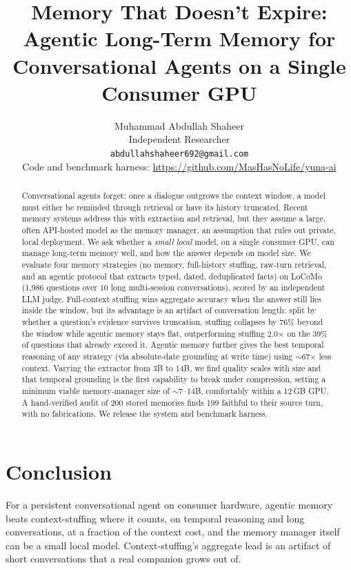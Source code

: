 \documentclass[11pt]{article}
\title{Memory That Doesn't Expire: Agentic Long-Term Memory for
Conversational Agents on a Single Consumer GPU}
\author{Muhammad Abdullah Shaheer\\
Independent Researcher\\
\texttt{abdullahshaheer692@gmail.com}\\[3pt]
\small Code and benchmark harness: \url{https://github.com/MasHasNoLife/yuna-ai}}
\date{}
\begin{document}
\maketitle

\begin{abstract}
Conversational agents forget: once a dialogue outgrows the context window, a
model must either be reminded through retrieval or have its history truncated.
Recent memory systems address this with extraction and retrieval, but they
assume a large, often API-hosted model as the memory manager, an assumption
that rules out private, local deployment. We ask whether a \emph{small local}
model, on a single consumer GPU, can manage long-term memory well, and how the
answer depends on model size. We evaluate four memory strategies (no memory,
full-history stuffing, raw-turn retrieval, and an agentic protocol that extracts
typed, dated, deduplicated facts) on LoCoMo (1{,}986 questions over 10 long
multi-session conversations), scored by an independent LLM judge. Full-context
stuffing wins aggregate accuracy when the answer still lies inside the window,
but its advantage is an artifact of conversation length: split by whether a
question's evidence survives truncation, stuffing collapses by 76\% beyond the
window while agentic memory stays flat, outperforming stuffing 2.0$\times$ on the
39\% of questions that already exceed it. Agentic memory further gives the best
temporal reasoning of any strategy (via absolute-date grounding at write time)
using $\sim$67$\times$ less context. Varying the extractor from 3B to 14B, we
find quality scales with size and that temporal grounding is the first capability
to break under compression, setting a minimum viable memory-manager size of
$\sim$7--14B, comfortably within a 12\,GB GPU. A hand-verified audit of 200
stored memories finds 199 faithful to their source turn, with no fabrications.
We release the system and benchmark harness.
\end{abstract}








\section{Conclusion}
For a persistent conversational agent on consumer hardware, agentic memory beats
context-stuffing where it counts, on temporal reasoning and long conversations, at
a fraction of the context cost, and the memory manager itself can be a small
local model. Context-stuffing's aggregate lead is an artifact of short
conversations that a real companion grows out of.



\end{document}

